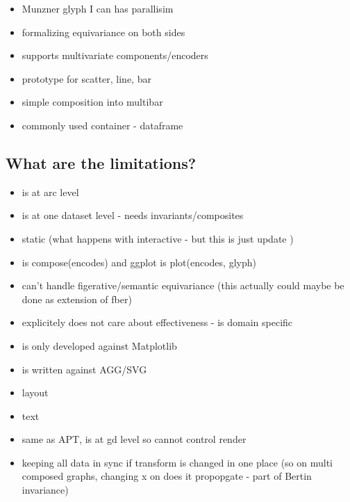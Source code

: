 \documentclass[../main.tex]{subfiles}
\begin{document}
 \begin{itemize}
    \item Munzner glyph I can has parallisim
    \item formalizing equivariance on both sides
    \item supports multivariate components/encoders 
    \item prototype for scatter, line, bar
    \item simple composition into multibar
    \item commonly used container - dataframe
 \end{itemize}

\subsection{What are the limitations?}
\begin{itemize}
\item is at arc level
\item is at one dataset level - needs invariants/composites
\item static (what happens with interactive - but this is just update )
\item is compose(encodes) and ggplot is plot(encodes, glyph)
\item can't handle figerative/semantic equivariance (this actually could maybe be done as extension of fber)
\item explicitely does not care about effectiveness - is domain specific 
\item is only developed against Matplotlib
\item is written against AGG/SVG
\item layout
\item text
\item same as APT, is at gd level so cannot control render 
\item keeping all data in sync if transform is changed in one place (so on multi composed graphs, changing x on does it propopgate - part of Bertin invariance)
\end{itemize}
\end{document}
